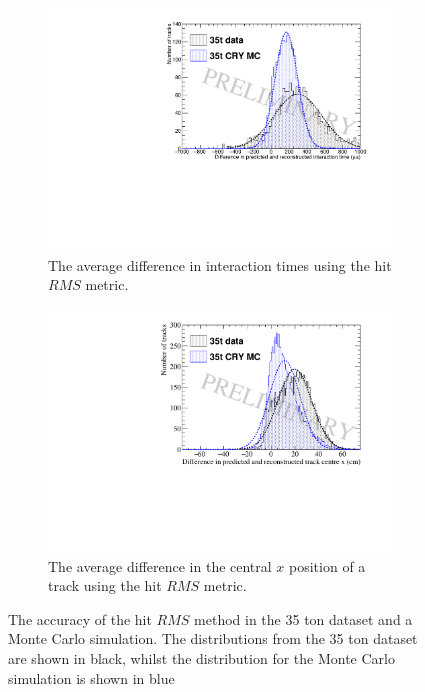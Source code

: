 \begin{figure}[h!]
  \centering
  \begin{subfigure}{0.6\textwidth}
    \centering
    \includegraphics[width=\textwidth]{PredictedTimeFromRMSFits}
    \caption{The average difference in interaction times using the hit $RMS$ metric.}
    \label{fig:DiffOverlayAvDiff_RMS_T}
  \end{subfigure}

  \begin{subfigure}{0.6\textwidth}
    \centering
    \includegraphics[width=\textwidth]{Overlay_AvXPosDiff_RMS}
    \caption{The average difference in the central $x$ position of a track using the hit $RMS$ metric.}
    \label{fig:DiffOverlayAvDiff_RMS_X}
  \end{subfigure}
  \caption[Comparing the accuracy of the hit $RMS$ method in the 35 ton dataset and a Monte Carlo simulation]
          {The accuracy of the hit $RMS$ method in the 35 ton dataset and a Monte Carlo simulation. The distributions from the 35 ton dataset are shown in black, whilst the distribution for the Monte Carlo simulation is shown in blue}
  \label{fig:DiffOverlayAvDiff_RMS}
\end{figure}

